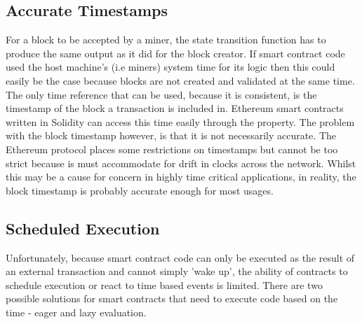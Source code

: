 \subsection{Accurate Timestamps}
For a block to be accepted by a miner, the state transition function has to produce the same output as it did for the block creator. If smart contract code used the host machine's (i.e miners) system time for its logic then this could easily  be the case because blocks are not created and validated at the same time. The only time reference that can be used, because it is consistent, is the timestamp of the block a transaction is included in. Ethereum smart contracts written in Solidity can access this time easily through the  property. The problem with the block timestamp however, is that it is not necessarily accurate. The Ethereum protocol places some restrictions on timestamps but cannot be too strict because is must accommodate for drift in clocks across the network. Whilst this may be a cause for concern in highly time critical applications, in reality, the block timestamp is probably accurate enough for most usages.\\

\subsection{Scheduled Execution}
Unfortunately, because smart contract code can only be executed as the result of an external transaction and cannot simply 'wake up', the ability of contracts to schedule execution or react to time based events is limited. There are two possible solutions for smart contracts that need to execute code based on the time - eager and lazy evaluation. \\

